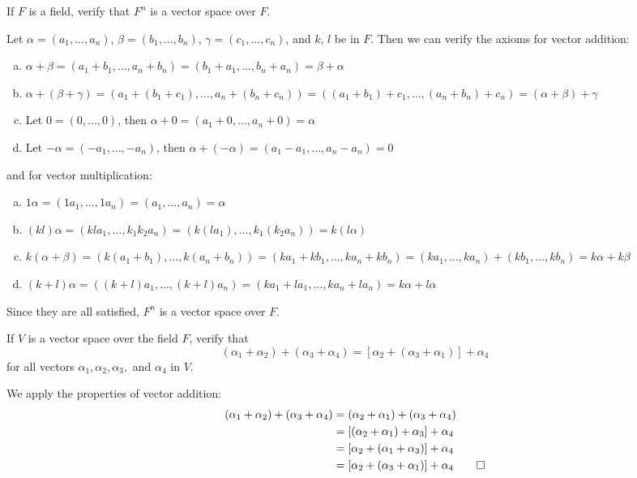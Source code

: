 \documentclass[notes]{agony}
\begin{document}
\begin{xca}
  If $F$ is a field, verify that $F^n$ is a vector space over $F$.
\end{xca}
\begin{prf}
  Let $\alpha = (a_1,\dotsc,a_n)$, $\beta = (b_1,\dotsc,b_n)$,
  $\gamma = (c_1,\dotsc,c_n)$, and $k$, $l$ be in $F$.
  Then we can verify the axioms for vector addition:
  \begin{enumerate}[(a)]
    \item $\alpha + \beta = (a_1+b_1,\dotsc,a_n+b_n) = (b_1+a_1,\dotsc,b_n+a_n) = \beta + \alpha$
    \item $\alpha + (\beta + \gamma) = (a_1+(b_1+c_1),\dotsc,a_n+(b_n+c_n)) = ((a_1+b_1)+c_1,\dotsc,(a_n+b_n)+c_n) = (\alpha + \beta) + \gamma$
    \item Let $0 = (0,\dotsc,0)$, then $\alpha+0 = (a_1+0,\dotsc,a_n+0) = \alpha$
    \item Let $-\alpha = (-a_1,\dotsc,-a_n)$, then $\alpha+(-\alpha) = (a_1-a_1,\dotsc,a_n-a_n) = 0$
  \end{enumerate}
  and for vector multiplication:
  \begin{enumerate}[(a)]
    \item $1\alpha = (1a_1,\dotsc,1a_n) = (a_1,\dotsc,a_n) = \alpha$
    \item $(k l)\alpha = (k l a_1,\dotsc,k_1 k_2 a_n) = (k(l a_1),\dotsc,k_1(k_2 a_n)) = k(l\alpha)$
    \item $k(\alpha+\beta) = (k(a_1+b_1),\dotsc,k(a_n+b_n)) = (ka_1+kb_1,\dotsc,ka_n+kb_n) = (ka_1,\dotsc,ka_n) + (kb_1,\dotsc,kb_n) = k\alpha + k\beta$
    \item $(k+l)\alpha = ((k+l)a_1,\dotsc,(k+l)a_n) = (ka_1+la_1,\dotsc,ka_n+la_n) = k\alpha + l\alpha$
  \end{enumerate}
  Since they are all satisfied, $F^n$ is a vector space over $F$.
\end{prf}

\begin{xca}
  If $V$ is a vector space over the field $F$, verify that
  \[ (\alpha_1 + \alpha_2) + (\alpha_3 + \alpha_4) = [\alpha_2 + (\alpha_3 + \alpha_1)] + \alpha_4 \]
  for all vectors $\alpha_1,\alpha_2,\alpha_3,$ and $\alpha_4$ in $V$.
\end{xca}
\begin{prf}
  We apply the properties of vector addition:
  \begin{align*}
    (\alpha_1 + \alpha_2) + (\alpha_3 + \alpha_4)
     & = (\alpha_2 + \alpha_1) + (\alpha_3 + \alpha_4)          \\
     & = [(\alpha_2 + \alpha_1) + \alpha_3] + \alpha_4          \\
     & = [\alpha_2 + (\alpha_1 + \alpha_3)] + \alpha_4          \\
     & = [\alpha_2 + (\alpha_3 + \alpha_1)] + \alpha_4 \qedhere
  \end{align*}
\end{prf}
\end{document}
